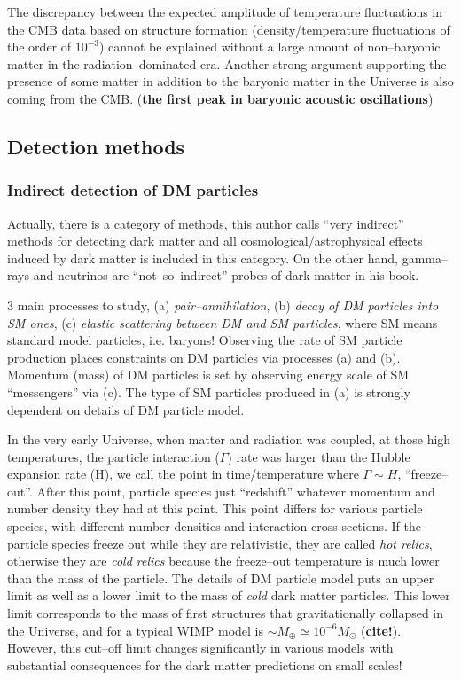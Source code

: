 \documentclass[paper=a4, fontsize=11pt]{scrartcl} %
\numberwithin{equation}{section} %
\numberwithin{figure}{section} %
\numberwithin{table}{section} %
\begin{document}
The discrepancy between the expected amplitude of temperature fluctuations in the CMB data based on structure formation (density/temperature fluctuations of the order of $10^{-3}$) cannot be explained without a large amount of non--baryonic matter in the radiation--dominated era. Another strong argument supporting the presence of some matter in addition to the baryonic matter in the Universe is also coming from the CMB. ({\bf the first peak in baryonic acoustic oscillations})


\subsection{Detection methods}
\subsubsection*{Indirect detection of DM particles}
Actually, there is a category of methods, this author calls ``very indirect'' methods for detecting dark matter and all cosmological/astrophysical effects induced by dark matter is included in this category. On the other hand, gamma--rays and neutrinos are ``not--so--indirect'' probes of dark matter in his book.

3 main processes to study, (a) \emph{pair--annihilation}, (b) \emph{decay of DM particles into SM ones}, (c) \emph{elastic scattering between DM and SM particles}, where SM means standard model particles, i.e. baryons!
Observing the rate of SM particle production places constraints on DM particles via processes (a) and (b).
Momentum (mass) of DM particles is set by observing energy scale of SM ``messengers'' via (c).
The type of SM particles produced in (a) is strongly dependent on details of DM particle model.

In the very early Universe, when matter and radiation was coupled, at those high temperatures, the particle interaction ($\Gamma$) rate was larger than the Hubble expansion rate (H), we call the point in time/temperature where $\Gamma \sim H$, ``freeze--out''. After this point, particle species just ``redshift'' whatever momentum and number density they had at this point. This point differs for various particle species, with different number densities and interaction cross sections. If the particle species freeze out while they are relativistic, they are called \emph{hot relics}, otherwise they are \emph{cold relics} because the freeze--out temperature is much lower than the mass of the particle. The details of DM particle model puts an upper limit as well as a lower limit to the mass of \emph{cold} dark matter particles. This lower limit corresponds to the mass of first structures that gravitationally collapsed in the Universe, and for a typical WIMP model is $\sim M_\oplus \simeq 10^{-6} M_\odot$ ({\bf cite!}). However, this cut--off limit changes significantly in various models with substantial consequences for the dark matter predictions on small scales! 
\end{document}
